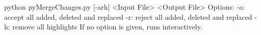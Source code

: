 python pyMergeChanges.py [-arh] <Input File> <Output File>
Options:
		-a: accept all added, deleted and replaced
		-r: reject all added, deleted and replaced
		-h: remove all highlights
If no option is given, runs interactively.
